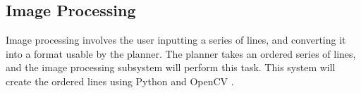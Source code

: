 
\subsection{Image Processing}
\label{sec:software_image}
Image processing involves the user inputting a series of lines, and converting it into a format usable by the planner. The planner takes an ordered series of lines, and the image processing subsystem will perform this task. This system will create the ordered lines using Python \cite{python27} and OpenCV \cite{opencv24}.
